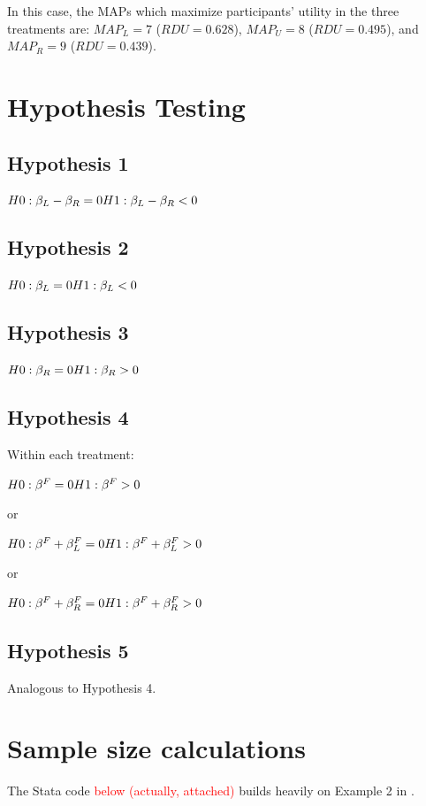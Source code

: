 In this case, the MAPs which maximize participants' utility in the three treatments are: $MAP_L = 7$ ($RDU = 0.628$), $MAP_U = 8$ ($RDU = 0.495$), and $MAP_R = 9$ ($RDU = 0.439$).

\section{Hypothesis Testing}
\label{section:appendixb}
\setcounter{figure}{0}
\setcounter{table}{0}
\renewcommand{\thefigure}{B.\arabic{figure}}
\renewcommand{\thetable}{B.\arabic{table}}

\subsection{Hypothesis 1}
$H0: \beta_L - \beta_R = 0 \\
H1: \beta_L - \beta_R < 0$

\subsection{Hypothesis 2}
$H0: \beta_L = 0 \\
H1: \beta_L < 0$

\subsection{Hypothesis 3}
$H0: \beta_R = 0 \\
H1: \beta_R > 0$

\subsection{Hypothesis 4}
Within each treatment:

\noindent $H0: \beta^F = 0 \\
H1: \beta^F > 0$

\noindent or

\noindent $H0: \beta^F + \beta_L^F = 0 \\
H1: \beta^F + \beta_L^F > 0$

\noindent or

\noindent $H0: \beta^F + \beta_R^F = 0 \\
H1: \beta^F + \beta_R^F > 0$

\subsection{Hypothesis 5}
Analogous to Hypothesis 4.


\section{Sample size calculations}
\label{section:appendixc}
\setcounter{figure}{0}
\setcounter{table}{0}
\renewcommand{\thefigure}{C.\arabic{figure}}
\renewcommand{\thetable}{C.\arabic{table}}

The Stata code \textcolor{red}{below (actually, attached)} builds heavily on Example 2 in \cite{CamposMercade2018}.




